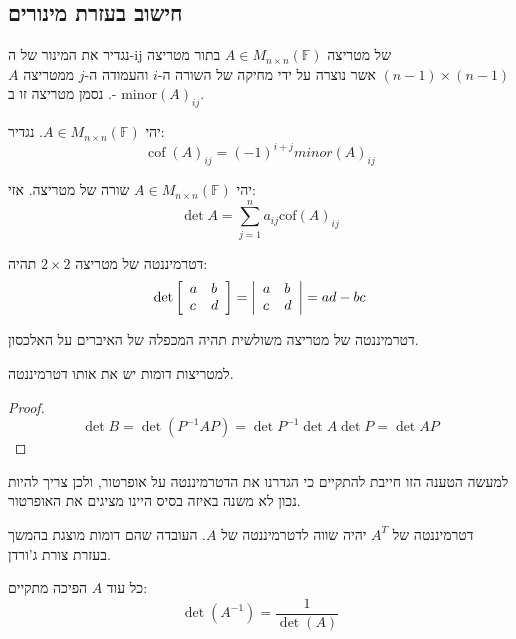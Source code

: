 \documentclass{tstextbook}
\begin{document}
\subsection{חישוב בעזרת מינורים}

\begin{definition}
נגדיר את המינור של ה-ij של מטריצה \(A\in M_{n\times n}\left( \mathbb{F}  \right)\) בתור מטריצה \((n-1)\times(n-1)\) אשר נוצרה על ידי מחיקה של השורה ה-\(i\) והעמודה ה-\(j\) ממטריצה \(A\). נסמן מטריצה זו ב- \(\text{minor}(A)_{ij}\).

\end{definition}
\begin{definition}
יהי \(A \in M_{n\times n}\left( \mathbb{F}  \right)\). נגדיר:
$$\operatorname{cof}(A)_{i j}=(-1)^{i+j}m i n o r(A)_{i j}$$

\end{definition}
\begin{proposition}
יהי \(A \in M_{n\times n}\left( \mathbb{F}  \right)\) שורה של מטריצה. אזי:
$$\det A=\sum_{j=1}^{n} a_{ij}\text{cof}(A)_{ij}$$

\end{proposition}
\begin{proposition}
דטרמיננטה של מטריצה \(2\times 2\) תהיה:
$$\operatorname*{det}{\left[\begin{array}{l l}{a}&{b}\\ {c}&{d}\end{array}\right]}={\left|\begin{array}{l l}{a}&{b}\\ {c}&{d}\end{array}\right|}=a d-b c$$

\end{proposition}
\begin{proposition}
דטרמיננטה של מטריצה משולשית תהיה המכפלה של האיברים על האלכסון.

\end{proposition}
\begin{proposition}
למטריצות דומות יש את אותו דטרמיננטה. 

\end{proposition}
\begin{proof}
$$\operatorname*{det}B=\operatorname*{det}(P^{-1}A P)=\operatorname*{det}P^{-1}\operatorname*{det}A\operatorname*{det}P=\operatorname*{det}A P$$

\end{proof}
\begin{remark}
למעשה הטענה הזו חייבת להתקיים כי הגדרנו את הדטרמיננטה על אופרטור, ולכן צריך להיות נכון לא משנה באיזה בסיס היינו מציגים את האופרטור.

\end{remark}
\begin{corollary}
דטרמיננטה של \(A^{T}\) יהיה שווה לדטרמיננטה של \(A\). העובדה שהם דומות מוצגת בהמשך בעזרת צורת ג'ורדן.

\end{corollary}
\begin{proposition}
כל עוד \(A\) הפיכה מתקיים:
$$\operatorname*{det}(A^{-1})={\frac{1}{\operatorname*{det}(A)}}$$

\end{proposition}
\end{document}

